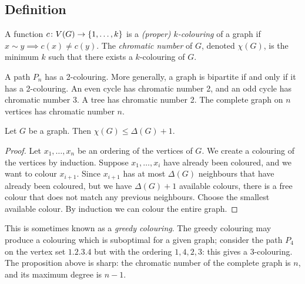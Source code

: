 \subsection{Definition}
\begin{definition}
	A function \( c \colon V(G) \to \qty{1, \dots, k} \) is a \emph{(proper) \( k \)-colouring} of a graph if \( x \sim y \implies c(x) \neq c(y) \).
	The \emph{chromatic number} of \( G \), denoted \( \chi(G) \), is the minimum \( k \) such that there exists a \( k \)-colouring of \( G \).
\end{definition}
\begin{example}
	A path \( P_n \) has a 2-colouring.
	More generally, a graph is bipartite if and only if it has a 2-colouring.
	An even cycle has chromatic number 2, and an odd cycle has chromatic number 3.
	A tree has chromatic number 2.
	The complete graph on \( n \) vertices has chromatic number \( n \).
\end{example}
\begin{proposition}
	Let \( G \) be a graph.
	Then \( \chi(G) \leq \Delta(G) + 1 \).
\end{proposition}
\begin{proof}
	Let \( x_1, \dots, x_n \) be an ordering of the vertices of \( G \).
	We create a colouring of the vertices by induction.
	Suppose \( x_1, \dots, x_i \) have already been coloured, and we want to colour \( x_{i+1} \).
	Since \( x_{i+1} \) has at most \( \Delta(G) \) neighbours that have already been coloured, but we have \( \Delta(G) + 1 \) available colours, there is a free colour that does not match any previous neighbours.
	Choose the smallest available colour.
	By induction we can colour the entire graph.
\end{proof}
\begin{remark}
	This is sometimes known as a \emph{greedy colouring}.
	The greedy colouring may produce a colouring which is suboptimal for a given graph; consider the path \( P_4 \) on the vertex set \( \qty{1, 2, 3, 4} \) but with the ordering \( 1, 4, 2, 3 \): this gives a 3-colouring.
	The proposition above is sharp: the chromatic number of the complete graph is \( n \), and its maximum degree is \( n - 1 \).
\end{remark}

